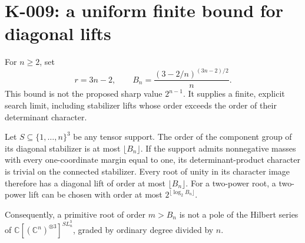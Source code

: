 \section{K-009: a uniform finite bound for diagonal lifts}
\label{sec:uniform-lift-bound}

For $n\ge2$, set
\[
 r=3n-2,\qquad B_n=\frac{(3-2/n)^{(3n-2)/2}}{n}.
\]
This bound is not the proposed sharp value $2^{n-1}$.
It supplies a finite, explicit search limit, including stabilizer lifts
whose order exceeds the order of their determinant character.

\begin{theorem}[K-009]
Let $S\subseteq\{1,\ldots,n\}^3$ be any tensor support.  The order of
the component group of its diagonal stabilizer is at most $\lfloor B_n\rfloor$.
If the support admits nonnegative masses with every one-coordinate
margin equal to one, its determinant-product character is trivial on
the connected stabilizer.  Every root of unity in its character image
therefore has a diagonal lift of order at most $\lfloor B_n\rfloor$.
For a two-power root, a two-power lift can be chosen with order at most
$2^{\lfloor\log_2 B_n\rfloor}$.

Consequently, a primitive root of order $m>B_n$ is not a pole of the
Hilbert series of $\mathbb C[(\mathbb C^n)^{\otimes3}]^{SL_n^3}$,
graded by ordinary degree divided by $n$.
\end{theorem}

